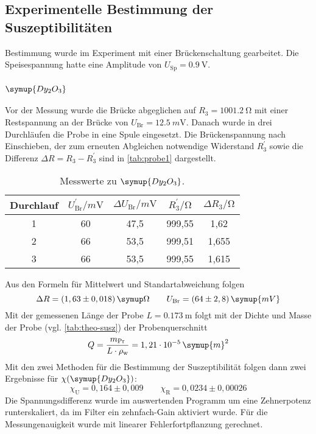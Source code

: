 \subsection{Experimentelle Bestimmung der Suszeptibilitäten}
\label{sec:Experimentelle Bestimmung der Suszeptibilitäten}

Bestimmung wurde im Experiment mit einer Brückenschaltung gearbeitet. Die Speisespannung
hatte eine Amplitude von $U_\text{Sp} = \SI{0.9}{\volt}$.

\subsubsection{$\symup{Dy_2O_3}$}
\label{sec:ausw-Dy2O3}

Vor der Messung wurde die Brücke abgeglichen auf $R_3 = \SI{1001.2}{\ohm}$ mit einer
Restspannung an der Brücke von $U_\text{Br} = \SI{12.5}{m\volt}$. Danach wurde in drei
Durchläufen die Probe in eine Spule eingesetzt. Die Brückenspannung nach Einschieben, der
zum erneuten Abgleichen notwendige Widerstand $R_3^\prime$ sowie die Differenz 
$\Delta R = R_3 - R_3^\prime$ sind in \autoref{tab:probe1} dargestellt.

\begin{table}
  \centering
  \caption{Messwerte zu $\symup{Dy_2O_3}$.}
  \label{tab:probe1}
  \begin{tabular}{c c c c c}
  \toprule
  Durchlauf &
  $U_\text{Br}^\prime / \si{m\volt}$ &
  $\Delta U_\text{Br} / \si{m\volt}$ &
  $R_3^\prime / \si{\ohm} $ &
  $\Delta R_3 / \si{\ohm} $ \\
  \midrule
  1 & 60 & 47,5 & 999,55 & 1,62 \\
  2 & 66 & 53,5 & 999,51 & 1,655 \\
  3 & 66 & 53,5 & 999,55 & 1,615 \\
  \bottomrule
  \end{tabular}
\end{table}
\noindent
Aus den Formeln für Mittelwert und Standartabweichung folgen
\begin{equation}
	\Delta R = (1,63 \pm 0,018) \,\symup\Omega
	\qquad
	U_\text{Br} = (64 \pm 2,8) \,\symup{mV}
\end{equation}
Mit der gemessenen Länge der Probe
$L = \SI{0.173}{\meter}$ folgt mit der Dichte und Masse der Probe 
(vgl. \autoref{tab:theo-susz}) der Probenquerschnitt 
\[
	Q =  \frac{m_\text{Pr}}{L \cdot \rho_\text{w}}
	= 1,21 \cdot 10^{-5} \,\symup{m}^2
\]
Mit den zwei Methoden für die Bestimmung der Suszeptibilität folgen dann zwei Ergebnisse
für $\chi(\symup{Dy_2O_3})$:
\begin{equation}
	\chi_\text{U} = 0,164 \pm 0,009
	\qquad
	\chi_\text{R} = 0,0234 \pm 0,00026
\end{equation}
Die Spannungsdifferenz wurde im auswertenden Programm um eine Zehnerpotenz runterskaliert, da
im Filter ein zehnfach-Gain aktiviert wurde. Für die Messungenauigkeit wurde 
mit linearer Fehlerfortpflanzung gerechnet.

